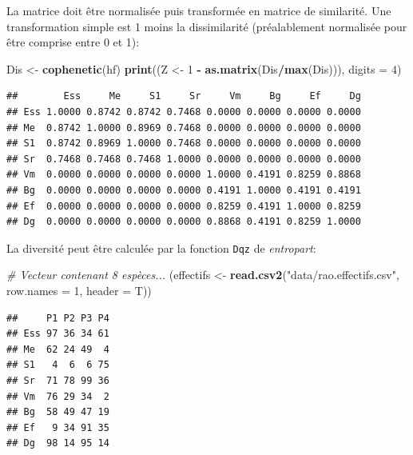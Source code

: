 \documentclass[
  11pt,
  french,
  a4paper,
  extrafontsizes,onecolumn,openright
  ]{memoir}
\newenvironment{Shaded}{\begin{snugshade}}{\end{snugshade}}
\newcommand{\CommentTok}[1]{\textcolor[rgb]{0.56,0.35,0.01}{\textit{#1}}}
\newcommand{\DataTypeTok}[1]{\textcolor[rgb]{0.13,0.29,0.53}{#1}}
\newcommand{\DecValTok}[1]{\textcolor[rgb]{0.00,0.00,0.81}{#1}}
\newcommand{\KeywordTok}[1]{\textcolor[rgb]{0.13,0.29,0.53}{\textbf{#1}}}
\newcommand{\NormalTok}[1]{#1}
\newcommand{\OperatorTok}[1]{\textcolor[rgb]{0.81,0.36,0.00}{\textbf{#1}}}
\newcommand{\StringTok}[1]{\textcolor[rgb]{0.31,0.60,0.02}{#1}}
\begin{document}
\normalsize

La matrice doit être normalisée puis transformée en matrice de similarité.
Une transformation simple est 1 moins la dissimilarité (préalablement normalisée pour être comprise entre 0 et 1):

\scriptsize

\begin{Shaded}
\begin{Highlighting}[]
\NormalTok{Dis <-}\StringTok{ }\KeywordTok{cophenetic}\NormalTok{(hf)}
\KeywordTok{print}\NormalTok{((Z <-}\StringTok{ }\DecValTok{1} \OperatorTok{-}\StringTok{ }\KeywordTok{as.matrix}\NormalTok{(Dis}\OperatorTok{/}\KeywordTok{max}\NormalTok{(Dis))), }\DataTypeTok{digits =} \DecValTok{4}\NormalTok{)}
\end{Highlighting}
\end{Shaded}

\begin{verbatim}
##        Ess     Me     S1     Sr     Vm     Bg     Ef     Dg
## Ess 1.0000 0.8742 0.8742 0.7468 0.0000 0.0000 0.0000 0.0000
## Me  0.8742 1.0000 0.8969 0.7468 0.0000 0.0000 0.0000 0.0000
## S1  0.8742 0.8969 1.0000 0.7468 0.0000 0.0000 0.0000 0.0000
## Sr  0.7468 0.7468 0.7468 1.0000 0.0000 0.0000 0.0000 0.0000
## Vm  0.0000 0.0000 0.0000 0.0000 1.0000 0.4191 0.8259 0.8868
## Bg  0.0000 0.0000 0.0000 0.0000 0.4191 1.0000 0.4191 0.4191
## Ef  0.0000 0.0000 0.0000 0.0000 0.8259 0.4191 1.0000 0.8259
## Dg  0.0000 0.0000 0.0000 0.0000 0.8868 0.4191 0.8259 1.0000
\end{verbatim}

\normalsize

La diversité peut être calculée par la fonction \texttt{Dqz} de \emph{entropart}:

\scriptsize

\begin{Shaded}
\begin{Highlighting}[]
\CommentTok{# Vecteur contenant 8 espèces...}
\NormalTok{(effectifs <-}\StringTok{ }\KeywordTok{read.csv2}\NormalTok{(}\StringTok{"data/rao.effectifs.csv"}\NormalTok{, }\DataTypeTok{row.names =} \DecValTok{1}\NormalTok{, }
    \DataTypeTok{header =}\NormalTok{ T))}
\end{Highlighting}
\end{Shaded}

\begin{verbatim}
##     P1 P2 P3 P4
## Ess 97 36 34 61
## Me  62 24 49  4
## S1   4  6  6 75
## Sr  71 78 99 36
## Vm  76 29 34  2
## Bg  58 49 47 19
## Ef   9 34 91 35
## Dg  98 14 95 14
\end{verbatim}
\end{document}
